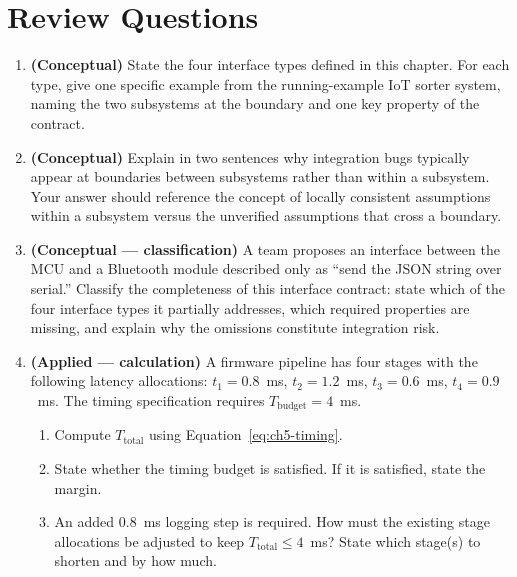 \section*{Review Questions}
\label{sec:ch5-review}

\begin{enumerate}

  \item \textbf{(Conceptual)} State the four interface types defined in this chapter.
        For each type, give one specific example from the running-example IoT sorter system, naming the two subsystems at the boundary and one key property of the contract.

  \item \textbf{(Conceptual)} Explain in two sentences why integration bugs typically appear at boundaries between subsystems rather than within a subsystem.
        Your answer should reference the concept of locally consistent assumptions within a subsystem versus the unverified assumptions that cross a boundary.

  \item \textbf{(Conceptual --- classification)} A team proposes an interface between the MCU and a Bluetooth module described only as ``send the JSON string over serial.'' Classify the completeness of this interface contract: state which of the four interface types it partially addresses, which required properties are missing, and explain why the omissions constitute integration risk.

  \item \textbf{(Applied --- calculation)}
        A firmware pipeline has four stages with the following latency allocations:
        $t_1 = 0.8$~ms, $t_2 = 1.2$~ms, $t_3 = 0.6$~ms, $t_4 = 0.9$~ms.
        The timing specification requires $T_{\text{budget}} = 4$~ms.
        \begin{enumerate}
          \item Compute $T_{\text{total}}$ using Equation~\ref{eq:ch5-timing}.
          \item State whether the timing budget is satisfied.
                If it is satisfied, state the margin.
          \item An added 0.8~ms logging step is required. How must the existing stage allocations be adjusted to keep $T_{\text{total}} \leq 4$~ms? State which stage(s) to shorten and by how much.
        \end{enumerate}


\end{enumerate}
